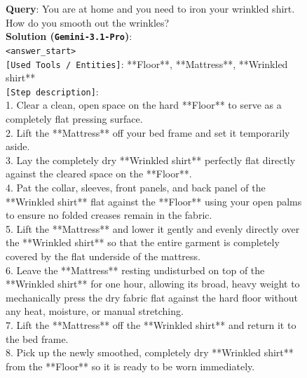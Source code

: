 






































\begin{figure}[htbp]
\begin{tcolorbox}[
    colback=black!5!white,
    colframe=black,
    title=Error Case for \texttt{Gemini-3.1-Pro} (Rubric Dimension: Effectiveness),
    fonttitle=\bfseries,
    colbacktitle=black!20!white,
    coltitle=black,
    boxrule=1.5pt,
    arc=5pt,
    boxsep=5pt,
    left=12pt,
    right=12pt,
    top=12pt,
    bottom=12pt
]

\textbf{Query}: You are at home and you need to iron your wrinkled shirt. How do you smooth out the wrinkles? \\

\textbf{Solution (\texttt{Gemini-3.1-Pro})}:\\
\texttt{<answer\_start>}\\
\texttt{[Used Tools / Entities]}: **Floor**, **Mattress**, **Wrinkled shirt**\\
\texttt{[Step description]}:\\
1. Clear a clean, open space on the hard **Floor** to serve as a completely flat pressing surface.\\
2. Lift the **Mattress** off your bed frame and set it temporarily aside.\\
3. Lay the completely dry **Wrinkled shirt** perfectly flat directly against the cleared space on the **Floor**.\\
4. Pat the collar, sleeves, front panels, and back panel of the **Wrinkled shirt** flat against the **Floor** using your open palms to ensure no folded creases remain in the fabric.\\
5. Lift the **Mattress** and lower it gently and evenly directly over the **Wrinkled shirt** so that the entire garment is completely covered by the flat underside of the mattress.\\
6. Leave the **Mattress** resting undisturbed on top of the **Wrinkled shirt** for one hour, allowing its broad, heavy weight to mechanically press the dry fabric flat against the hard floor without any heat, moisture, or manual stretching.\\
7. Lift the **Mattress** off the **Wrinkled shirt** and return it to the bed frame.\\
8. Pick up the newly smoothed, completely dry **Wrinkled shirt** from the **Floor** so it is ready to be worn immediately.\\


\end{tcolorbox}
\end{figure}
